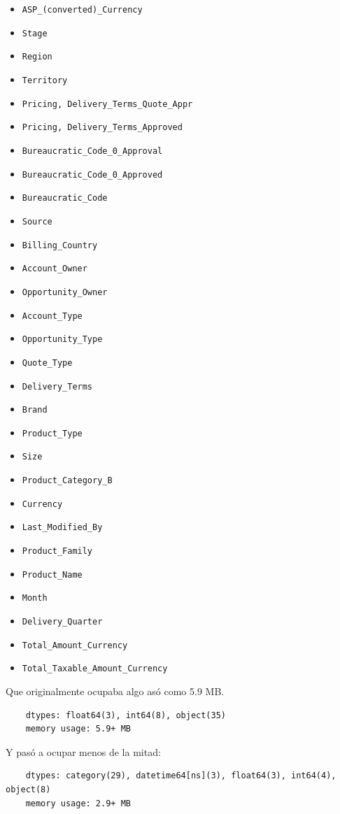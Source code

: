 \documentclass[titlepage,a4paper]{article}
\begin{document}
\begin{itemize}
    \item \verb|ASP_(converted)_Currency|
    \item \verb|Stage|
    \item \verb|Region|
    \item \verb|Territory|
    \item \verb|Pricing, Delivery_Terms_Quote_Appr|
    \item \verb|Pricing, Delivery_Terms_Approved|
    \item \verb|Bureaucratic_Code_0_Approval|
    \item \verb|Bureaucratic_Code_0_Approved|
    \item \verb|Bureaucratic_Code|
    \item \verb|Source|
    \item \verb|Billing_Country|
    \item \verb|Account_Owner|
    \item \verb|Opportunity_Owner|
    \item \verb|Account_Type|
    \item \verb|Opportunity_Type|
    \item \verb|Quote_Type|
    \item \verb|Delivery_Terms|
    \item \verb|Brand|
    \item \verb|Product_Type|
    \item \verb|Size|
    \item \verb|Product_Category_B|
    \item \verb|Currency|
    \item \verb|Last_Modified_By|
    \item \verb|Product_Family|
    \item \verb|Product_Name|
    \item \verb|Month|
    \item \verb|Delivery_Quarter|
    \item \verb|Total_Amount_Currency|
    \item \verb|Total_Taxable_Amount_Currency|
\end{itemize}

Que originalmente ocupaba algo asó como 5.9 MB.
\begin{verbatim}
    dtypes: float64(3), int64(8), object(35)
    memory usage: 5.9+ MB
\end{verbatim}

Y pasó a ocupar menos de la mitad:
\begin{verbatim}
    dtypes: category(29), datetime64[ns](3), float64(3), int64(4), object(8)
    memory usage: 2.9+ MB
\end{verbatim}
\end{document}
